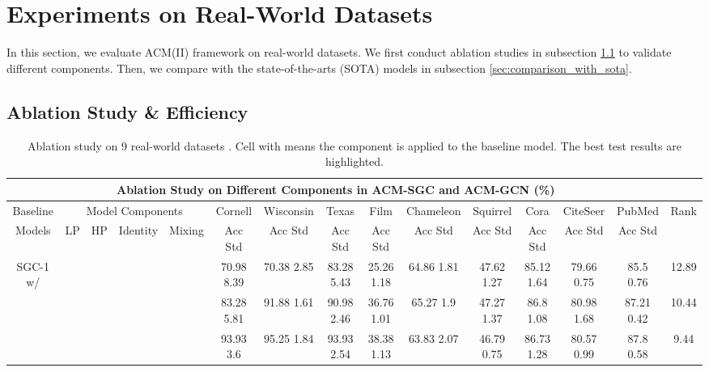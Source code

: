 \documentclass{article}
\newcommand{\0}{{\boldsymbol{0}}}
\newcommand{\6}{{\partial}}
\newcommand{\8}{{\infty}}
\newcommand{\4}{{\nabla}}
\begin{document}
\section{Experiments on Real-World Datasets}
\label{sec:experiments}
In this section, we evaluate ACM(II) framework on real-world datasets. We first conduct ablation studies in subsection \ref{sec:ablation_tests_running_time} to validate different components. Then, we compare with the state-of-the-arts (SOTA) models in subsection \ref{sec:comparison_with_sota}.

\subsection{Ablation Study \& Efficiency}
\label{sec:ablation_tests_running_time}
\begin{table}[htbp]
  \centering
  \tiny
  \caption{Ablation study on 9 real-world datasets \cite{pei2020geom}. Cell with \checkmark means the component is applied to the baseline model. The best test results are highlighted.}
  \label{tab:ablation_study}
  \setlength{\tabcolsep}{1pt}
    \begin{tabular}{c|cccc|ccccccccc|r}
    \toprule
    \toprule
    \multicolumn{14}{c}{Ablation Study on Different Components in ACM-SGC and ACM-GCN (\%)}                       &  \\
    \midrule
    \multicolumn{1}{p{4.125em}|}{Baseline    } & \multicolumn{4}{c|}{Model Components} & Cornell & Wisconsin & Texas & Film  & Chameleon & Squirrel & Cora  & CiteSeer & PubMed & \multicolumn{1}{c}{\multirow{1}[4]{*}{Rank}} \\
\cmidrule{2-14}    \multicolumn{1}{p{4.125em}|}{Models} & LP    & HP    & Identity & Mixing & Acc  Std & Acc  Std & Acc  Std & Acc  Std & Acc  Std & Acc  Std & Acc  Std & Acc  Std & Acc  Std &  \\
    \midrule
    \multicolumn{1}{c|}{\multirow{5}[1]{*}{SGC-1 w/}} &  &       &       &       & 70.98  8.39 & 70.38  2.85 & 83.28  5.43 & 25.26  1.18 & 64.86  1.81 & 47.62  1.27 & 85.12  1.64 & 79.66  0.75 & 85.5  0.76 & \multicolumn{1}{c}{12.89} \\
          &  &  &       &  & 83.28  5.81 & 91.88  1.61 & 90.98  2.46 & 36.76  1.01 & 65.27  1.9 & 47.27  1.37 & 86.8  1.08 & 80.98  1.68 & 87.21  0.42 & \multicolumn{1}{c}{10.44} \\
          &  &       &  &  & 93.93  3.6 & 95.25  1.84 & 93.93  2.54 & 38.38  1.13 & 63.83  2.07 & 46.79  0.75 & 86.73  1.28 & 80.57  0.99 & 87.8  0.58 & \multicolumn{1}{c}{9.44} \\

\end{tabular}
\end{table}
\end{document}
